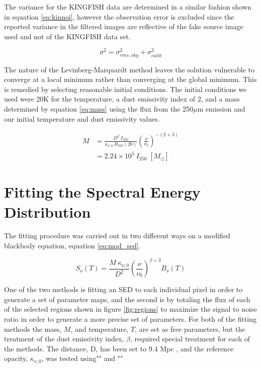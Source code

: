 The variance for the KINGFISH data are determined in a similar fashion shown in equation \ref{eq:kinnoi}, however the observation error is excluded since the reported variance in the filtered images are reflective of the fake source image used and not of the KINGFISH data set.

\begin{equation}\label{eq:kinnoi}
  \sigma^2 = \sigma_{rms,sky}^2 + \sigma_{calib}^2
\end{equation}

The nature of the Levinberg-Marquardt method leaves the solution vulnerable to converge at a local minimum rather than converging at the global minimum.  This is remedied by selecting reasonable initial conditions.  The initial conditions we used were 20K for the temperature, a dust emissivity index of 2, and a mass determined by equation \ref{eq:mass} using the flux from the 250$\mu$m emission and our initial temperature and dust emissivity values.  

\begin{equation}\label{eq:mass}
  \begin{split}
    M & = \frac{D^2 \: I_{250}}{\kappa_{\nu,0} \:  B_{250}\left(20\right)} \left(\frac{\nu}{\nu_0} \right)^{-\left(2+3\right)} \\
      & = 2.24 \times 10^5 \: I_{250} \; \left[M_\odot\right]
  \end{split}
\end{equation}

\section{Fitting the Spectral Energy Distribution}

The fitting procedure was carried out in two different ways on a modified blackbody equation, equation \ref{eq:mod_sed}. 

\begin{equation}\label{eq:mod_sed}
  S_\nu\left(T\right) = \frac{M\:\kappa_{\nu,0}}{D^2}\left(\frac{\nu}{\nu_0}\right)^{\beta+3} B_\nu\left(T\right)
\end{equation}

One of the two methods is fitting an SED to each individual pixel in order to generate a set of parameter maps, and the second is by totaling the flux of each of the selected regions shown in figure \ref{fig:regions} to maximize the signal to noise ratio in order to generate a more precise set of parameters.  For both of the fitting methods the mass, $M$, and temperature, $T$, are set as free parameters, but the treatment of the dust emissivity index, $\beta$, required special treatment for each of the methods.  The distance, D, has been set to 9.4 Mpc \citep{?}, and the reference opacity, $\kappa_{\nu,0}$, was tested using"" \citep{lianddrane} and "" \citep{planck20??}

